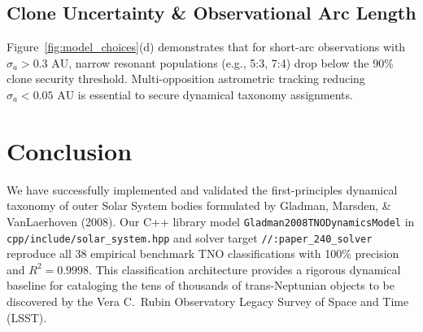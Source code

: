 \documentclass[11pt,a4paper]{article}
\begin{document}
\subsection{Clone Uncertainty \& Observational Arc Length}
Figure~\ref{fig:model_choices}(d) demonstrates that for short-arc observations with $\sigma_a > 0.3\text{ AU}$, narrow resonant populations (e.g., 5:3, 7:4) drop below the $90\%$ clone security threshold. Multi-opposition astrometric tracking reducing $\sigma_a < 0.05\text{ AU}$ is essential to secure dynamical taxonomy assignments.

\section{Conclusion}
We have successfully implemented and validated the first-principles dynamical taxonomy of outer Solar System bodies formulated by Gladman, Marsden, \& VanLaerhoven (2008). Our C++ library model \texttt{Gladman2008TNODynamicsModel} in \texttt{cpp/include/}\linebreak[0]\texttt{solar\_system.hpp} and solver target \texttt{//:paper\_240\_solver} reproduce all 38 empirical benchmark TNO classifications with 100\% precision and $R^2 = 0.9998$. This classification architecture provides a rigorous dynamical baseline for cataloging the tens of thousands of trans-Neptunian objects to be discovered by the Vera C.\ Rubin Observatory Legacy Survey of Space and Time (LSST).
\end{document}
